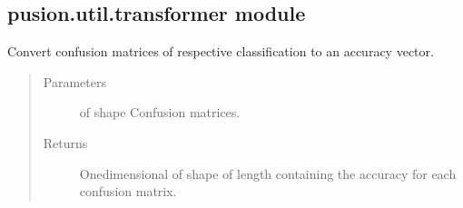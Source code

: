 \documentclass[letterpaper,10pt,english]{sphinxmanual}
\begin{document}
\subsection{pusion.util.transformer module}
\label{\detokenize{pusion.util.transformer:module-pusion.util.transformer}}\label{\detokenize{pusion.util.transformer:pusion-util-transformer-module}}\label{\detokenize{pusion.util.transformer:transformer-cref}}\label{\detokenize{pusion.util.transformer::doc}}

\begin{fulllineitems}
\label{\detokenize{pusion.util.transformer:pusion.util.transformer.confusion_matrices_to_accuracy_vector}}
\sphinxAtStartPar
Convert confusion matrices of respective classification to an accuracy vector.
\begin{quote}\begin{description}
\item[{Parameters}] \leavevmode
\sphinxAtStartPar
{} \textendash{}  of shape 
Confusion matrices.

\item[{Returns}] \leavevmode
\sphinxAtStartPar
One\sphinxhyphen{}dimensional  of shape of length  containing the accuracy for each confusion
matrix.

\end{description}\end{quote}

\end{fulllineitems}

\end{document}
